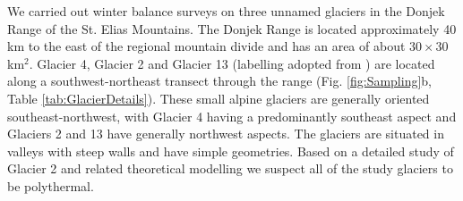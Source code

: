 \documentclass[review,oneside, letterpaper]{igs} %
\begin{document}
We carried out winter balance surveys on three unnamed glaciers in the Donjek Range of the St. Elias Mountains. The Donjek Range is located approximately 40 km to the east of the regional mountain divide and has an area of about $30\times30$\,km$^2$. Glacier 4, Glacier 2 and Glacier 13 (labelling adopted from \cite{Crompton2016}) are located along a southwest-northeast transect through the range (Fig. \ref{fig:Sampling}b, Table \ref{tab:GlacierDetails}). These small alpine glaciers are generally oriented southeast-northwest, with Glacier 4 having a predominantly southeast aspect and Glaciers 2 and 13 have generally northwest aspects. The glaciers are situated in valleys with steep walls and have simple geometries. Based on a detailed study of Glacier 2  \citep{Wilson2013} and related theoretical modelling \citep{Wilson2013a} we suspect all of the study glaciers to be polythermal. 
\end{document}
